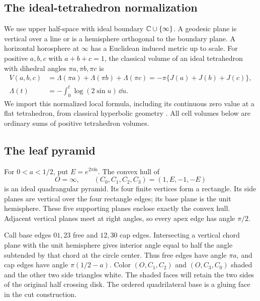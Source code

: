 \subsection{The ideal-tetrahedron normalization}
\label{sm:local-cells}

We use upper half-space with ideal boundary
$\mathbb C\cup\{\infty\}$. A geodesic plane is vertical over a line or
is a hemisphere orthogonal to the boundary plane. A horizontal
horosphere at $\infty$ has a Euclidean induced metric up to scale.
For positive $a,b,c$ with $a+b+c=1$, the classical volume of
an ideal tetrahedron with dihedral angles $\pi a,\pi b,\pi c$ is
\begin{equation}\label{sm:tetra}
 \begin{split}
 V(a,b,c)&=\Lambda(\pi a)+\Lambda(\pi b)+\Lambda(\pi c)
              =-\pi\{J(a)+J(b)+J(c)\},\\
 \Lambda(t)&=-\int_0^t\log(2\sin u)\,\dd u .
 \end{split}
\end{equation}
We import this normalized local formula, including its continuous
zero value at a flat tetrahedron, from classical hyperbolic
geometry \cite{Milnor}. All cell volumes below are ordinary sums
of positive tetrahedron volumes.

\subsection{The leaf pyramid}
For $0<a<1/2$, put $E=e^{2\pi\ii a}$. The convex hull of
\begin{equation}\label{sm:leaf}
 O=\infty,\qquad (C_0,C_1,C_2,C_3)=(1,E,-1,-E)
\end{equation}
is an ideal quadrangular pyramid. Its four finite vertices form
a rectangle. Its side planes are vertical over the four rectangle
edges; its base plane is the unit hemisphere. These five
supporting planes enclose exactly the convex hull. Adjacent
vertical planes meet at right angles, so every apex edge has
angle $\pi/2$.

Call base edges $01,23$ free and $12,30$ cap edges. Intersecting
a vertical chord plane with the unit hemisphere gives interior
angle equal to half the angle subtended by that chord at the
circle center. Thus free edges have angle $\pi a$, and cap
edges have angle $\pi(1/2-a)$.
Color $(O,C_1,C_2)$ and $(O,C_3,C_0)$ shaded and the other two
side triangles white. The shaded faces will retain the two
sides of the original half crossing disk. The ordered
quadrilateral base is a gluing face in the cut construction.

